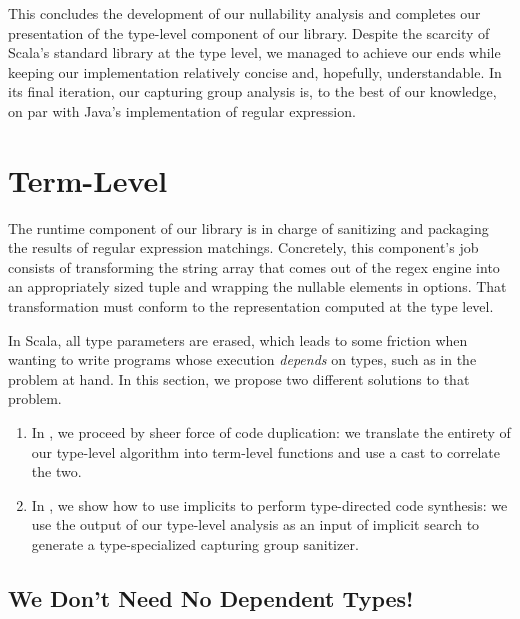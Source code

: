 \regexLastIteration

This concludes the development of our nullability analysis and completes our presentation of the type-level component of our library.
Despite the scarcity of Scala's standard library at the type level, we managed to achieve our ends while keeping our implementation relatively concise and, hopefully, understandable.
In its final iteration, our capturing group analysis is, to the best of our knowledge, on par with Java's implementation of regular expression.

\section{Term-Level}
\label{sec:term-level}

The runtime component of our library is in charge of sanitizing and packaging the results of regular expression matchings.
Concretely, this component's job consists of transforming the string array that comes out of the regex engine into an appropriately sized tuple and wrapping the nullable elements in options.
That transformation must conform to the representation computed at the type level.

In Scala, all type parameters are erased, which leads to some friction when wanting to write programs whose execution \emph{depends} on types, such as in the problem at hand. In this section, we propose two different solutions to that problem.


\begin{enumerate}
  \item In , we proceed by sheer force of code duplication: we translate the entirety of our type-level algorithm into term-level functions and use a cast to correlate the two.

  \item In , we show how to use implicits to perform type-directed code synthesis: we use the output of our type-level analysis as an input of implicit search to generate a type-specialized capturing group sanitizer.
\end{enumerate}

\subsection{We Don't Need No Dependent Types!}
\label{subsec:we-ain-t-need-no-dependent-types}

